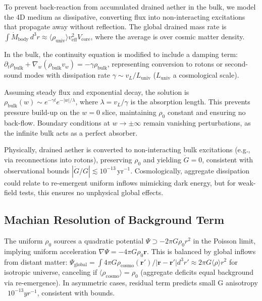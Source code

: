 \documentclass{article}
\begin{document}
To prevent back-reaction from accumulated drained aether in the bulk, we model the 4D medium as dissipative, converting flux into non-interacting excitations that propagate away without reflection. The global drained mass rate is $\int \dot{M}_{\text{body}} \, d^3 r \approx \langle \rho_{\text{univ}} \rangle v_{\text{eff}}^2 V_{\text{core}}$, where the average is over cosmic matter density.

In the bulk, the continuity equation is modified to include a damping term: $\partial_t \rho_{\text{bulk}} + \nabla_w (\rho_{\text{bulk}} v_w) = -\gamma \rho_{\text{bulk}}$, representing conversion to rotons or second-sound modes with dissipation rate $\gamma \sim v_L / L_{\text{univ}}$ ($L_{\text{univ}}$ a cosmological scale).

Assuming steady flux and exponential decay, the solution is $\rho_{\text{bulk}}(w) \sim e^{-\gamma t} e^{-|w| / \lambda}$, where $\lambda = v_L / \gamma$ is the absorption length. This prevents pressure build-up on the $w=0$ slice, maintaining $\rho_0$ constant and ensuring no back-flow. Boundary conditions at $w \to \pm \infty$ remain vanishing perturbations, as the infinite bulk acts as a perfect absorber.

Physically, drained aether is converted to non-interacting bulk excitations (e.g., via reconnections into rotons), preserving $\rho_0$ and yielding $\dot{G} = 0$, consistent with observational bounds $|\dot{G}/G| \lesssim 10^{-13} \, \mathrm{yr}^{-1}$. Cosmologically, aggregate dissipation could relate to re-emergent uniform inflows mimicking dark energy, but for weak-field tests, this ensures no unphysical global effects.

\subsection{Machian Resolution of Background Term}

The uniform $\rho_0$ sources a quadratic potential $\Psi \supset -2\pi G \rho_0 r^2$ in the Poisson limit, implying uniform acceleration $\nabla \Psi = -4\pi G \rho_0 \mathbf{r}$. This is balanced by global inflows from distant matter: $\Psi_{\text{global}} = \int 4\pi G \rho_{\text{cosmo}}(\mathbf{r}') / |\mathbf{r} - \mathbf{r}'| d^3 r' \approx 2\pi G \langle \rho \rangle r^2$ for isotropic universe, canceling if $\langle \rho_{\text{cosmo}} \rangle = \rho_0$ (aggregate deficits equal background via re-emergence). In asymmetric cases, residual term predicts small G anisotropy ~$10^{-13} yr^{-1}$, consistent with bounds.
\end{document}

